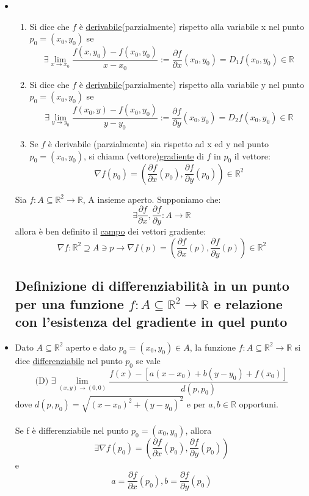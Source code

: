 \documentclass{report}
\newcommand{\ace}{\`e }
\newcommand{\aca}{\`a }
\newcommand{\Ins}[1]{\mathbb{#1}}
\newcommand{\R}{\Ins{R}}
\newcommand{\f}{f: A \subseteq \R^2 \to \R}
\newcommand{\ppartx}{\frac{\partial f}{\partial x}(p_0)}
\newcommand{\pparty}{\frac{\partial f}{\partial y}(p_0)}
\begin{document}
\begin{itemize}
    \subsection{Definizione di derivate parziali e di vettore gradiente per una funzione $\f$ A aperto}
    \item \begin{enumerate}
            \item Si dice che $f$ \ace \underline{derivabile}(parzialmente) rispetto alla variabile x nel punto $p_0 = (x_0,y_0)$ se 
                  $$\exists \lim_{x \to x_0} \frac{f(x,y_0) - f(x_0,y_0)}{x-x_0} := \frac{\partial f}{\partial x}(x_0,y_0) = D_1 f(x_0,y_0) \in \R$$
            \item Si dice che $f$ \ace \underline{derivabile}(parzialmente) rispetto alla variabile y nel punto $p_0 = (x_0,y_0)$ se 
                  $$\exists \lim_{y \to y_0} \frac{f(x_0,y) - f(x_0,y_0)}{y-y_0} := \frac{\partial f}{\partial y}(x_0,y_0) = D_2 f(x_0,y_0) \in \R$$
            \item Se $f$ \ace derivabile (parzialmente) sia rispetto ad x ed y nel punto $p_0 = (x_0,y_0)$, si chiama (vettore)\underline{gradiente} di $f$ in $p_0$
                  il vettore:
                  $$\nabla f(p_0) = \left(\frac{\partial f}{\partial x}(p_0), \frac{\partial f}{\partial y}(p_0)\right) \in \R^2$$
          \end{enumerate}
          Sia $\f$, A insieme aperto. Supponiamo che:
          $$\exists \frac{\partial f}{\partial x},\frac{\partial f}{\partial y} : A \to \R$$
          allora \ace ben definito il \underline{campo} dei vettori gradiente:
          $$\nabla f : \R^2 \supseteq A \ni p \to \nabla f(p) = \left(\frac{\partial f}{\partial x}(p), \frac{\partial f}{\partial y}(p)\right) \in \R^2$$

    \subsection{Definizione di differenziabilit\aca in un punto per una funzione $\f$ e relazione con l'esistenza del gradiente in quel punto}
    \item  Dato $A \subseteq \R^2$ aperto e dato $p_0=(x_0,y_0)\in A$, la funzione $\f$ si dice \underline{differenziabile}
           nel punto $p_0$ se vale 
           $$\text{(D) } \exists \lim_{(x,y)\to (0,0)}\frac{f(x)-\left[a(x-x_0)+b(y-y_0)+f(x_0)\right]}{d(p,p_0)}$$
           dove $d(p,p_0) = \sqrt{(x-x_0)^2+(y-y_0)^2}$ e per $a,b \in \R$ opportuni. \\\\
           Se f \ace differenziabile nel punto $p_0 =(x_0,y_0)$, allora $$\exists\nabla f(p_0) = \left(\ppartx, \pparty\right)$$
           e $$a = \ppartx , b =\pparty $$
    

\end{itemize}
\end{document}
